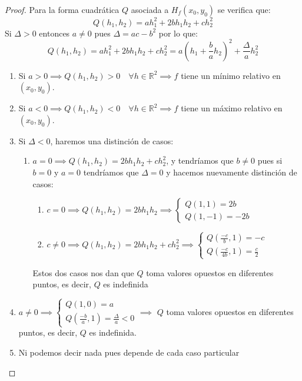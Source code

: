 \begin{proof}
    Para la forma cuadrática $Q$ asociada a $H_f(x_0, y_0)$ se verifica que: 
    $$Q(h_1, h_2) = ah_1^2 + 2bh_1h_2 + ch_2^2 $$
    Si $\Delta > 0$ entonces $a \neq 0$ pues $\Delta = ac - b^2$ por lo que: 
    $$Q(h_1, h_2) = ah_1^2 + 2bh_1h_2 + ch_2^2 = a \left(h_1 + \frac{b}{a}h_2\right)^2 + \frac{\Delta}{a}h_2^2$$
    \begin{enumerate}
        \item Si $a > 0 \implies Q(h_1, h_2) > 0 \quad \forall h \in \mathbb{R}^2 \implies f$ tiene un mínimo relativo en $(x_0, y_0)$.
        \item Si $a < 0 \implies Q(h_1, h_2) < 0 \quad \forall h \in \mathbb{R}^2 \implies f$ tiene un máximo relativo en $(x_0, y_0)$.
        \item Si $\Delta < 0$, haremos una distinción de casos: 
        \begin{enumerate}
            \item $a = 0 \implies Q(h_1, h_2) = 2bh_1h_2 + ch_2^2$, y tendríamos que $b \neq 0$ pues si $b = 0$ y $a = 0$ tendríamos que $\Delta = 0$ y hacemos nuevamente distinción de casos: 
            \begin{enumerate}
                \item $c = 0 \implies Q(h_1, h_2) = 2bh_1h_2 \implies \begin{cases}
                    Q(1, 1) = 2b \\
                    Q(1, -1) = -2b
                \end{cases}$
                \item $c \neq 0 \implies Q(h_1, h_2) = 2bh_1h_2 + ch_2^2 \implies \begin{cases}
                    Q(\frac{-c}{b}, 1) = -c \\
                    Q(\frac{-c}{4b}, 1) = \frac{c}{2}            
                \end{cases}$
            \end{enumerate}
            Estos dos casos nos dan que $Q$ toma valores opuestos en diferentes puntos, es decir, $Q$ es indefinida
        \end{enumerate}
        \item $a \neq 0 \implies \begin{cases}
            Q(1, 0) = a \\
            Q(\frac{-b}{a}, 1) = \frac{\Delta}{a} < 0
        \end{cases} \implies$ $Q$ toma valores opuestos en diferentes puntos, es decir, $Q$ es indefinida.
        \item Ni podemos decir nada pues depende de cada caso particular
    \end{enumerate}
\end{proof}

